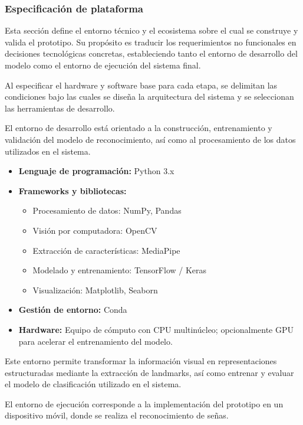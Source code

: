 	
	\subsubsection{Especificación de plataforma}
	
	Esta sección define el entorno técnico y el ecosistema sobre el cual se construye y valida el prototipo. Su propósito es traducir los requerimientos no funcionales en decisiones tecnológicas concretas, estableciendo tanto el entorno de desarrollo del modelo como el entorno de ejecución del sistema final.
	
	Al especificar el hardware y software base para cada etapa, se delimitan las condiciones bajo las cuales se diseña la arquitectura del sistema y se seleccionan las herramientas de desarrollo.
	
	
	El entorno de desarrollo está orientado a la construcción, entrenamiento y validación del modelo de reconocimiento, así como al procesamiento de los datos utilizados en el sistema.
	
	\begin{itemize}
		\item \textbf{Lenguaje de programación:} Python 3.x
		\item \textbf{Frameworks y bibliotecas:}
		\begin{itemize}
			\item Procesamiento de datos: NumPy, Pandas
			\item Visión por computadora: OpenCV
			\item Extracción de características: MediaPipe
			\item Modelado y entrenamiento: TensorFlow / Keras
			\item Visualización: Matplotlib, Seaborn
		\end{itemize}
		\item \textbf{Gestión de entorno:} Conda
		\item \textbf{Hardware:} Equipo de cómputo con CPU multinúcleo; opcionalmente GPU para acelerar el entrenamiento del modelo.
	\end{itemize}
	
	Este entorno permite transformar la información visual en representaciones estructuradas mediante la extracción de landmarks, así como entrenar y evaluar el modelo de clasificación utilizado en el sistema.
	
	
	El entorno de ejecución corresponde a la implementación del prototipo en un dispositivo móvil, donde se realiza el reconocimiento de señas.
	
